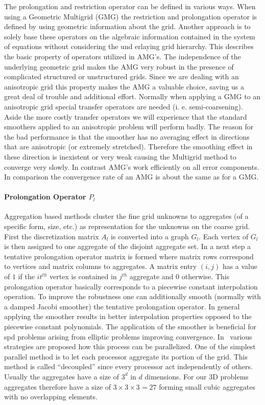 The prolongation and restriction operator can be defined in various
ways.  When using a Geometric Multigrid (GMG) the restriction and
prolongation operator is defined by using geometric information about
the grid.   Another approach is to solely base these operators on the
algebraic information contained in the system of equations without
considering the und erlaying grid hierarchy.  This describes the basic
property of operators utilized in AMG's.  The independence of the
underlying geometric grid makes the AMG very robust in the presence of
complicated structured or unstructured grids.  Since we are dealing with
an anisotropic grid this property makes the AMG a valuable choice,
saving us a great deal of trouble and additional effort.  Normally when
applying a GMG to an anisotropic grid special transfer operators are
needed (i.   e.  semi-coarsening).  Aside the more costly transfer
operators we will experience that the standard smoothers applied to an
anisotropic problem will perform badly.  The reason for the bad
performance is that the smoother has no averaging effect in directions
that are anisotropic (or extremely stretched).  Therefore the smoothing
effect in these direction is inexistent or very weak causing the
Multigrid method to converge very slowly.  In contrast AMG's work
efficiently on all error components.  In comparison the convergence rate
of an AMG is about the same as for a GMG.

\paragraph{Prolongation Operator $P_l$} Aggregation based methods
cluster the fine grid unknowns to aggregates (of a specific form, size,
etc.) as representation for the unknowns on the coarse grid.  First the
discretization matrix $A_l$ is converted into a graph $G_l$.  Each vertex
of $G_l$ is then assigned to one aggregate of the disjoint aggregate
set.  In a next step a tentative prolongation operator matrix is formed
where matrix rows correspond to vertices and matrix columns to
aggregates.  A matrix entry $(i,j)$ has a value of $1$ if the $it^{th}$
vertex is contained in $j^{th}$ aggregate and $0$ otherwise.  This
prolongation operator basically corresponds to a piecewise constant
interpolation operation.  To improve the robustness one can additionally
smooth (normally with a damped Jacobi smoother) the tentative
prolongation operator.  In general applying the smoother results in
better interpolation properties opposed to the piecewise constant
polynomials.  The application of the smoother is beneficial for spd
problems arising from elliptic problems improving convergence.
In~\cite{tuto:00} various strategies are proposed how this process
can be parallelized.  One of the simplest parallel method is to let each
processor aggregate its portion of the grid.  This method is called
``decoupled'' since every processor act independently of others.  Usually
the aggregates have a size of $3^d$ in $d$ dimensions.  For our 3D
problems aggregates therefore have a size of $3 \times 3 \times 3 = 27$
forming small cubic aggregates with no overlapping elements.

